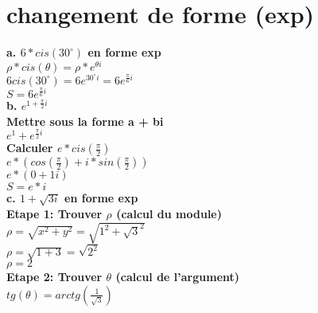 \newpage
\section{changement de forme (exp)}
\vspace{5mm}

\textbf{a. $6*cis(30^{\circ})$ en forme exp} \\

$\rho*cis(\theta) = \rho * e^{\theta i}$\\

$6 cis(30^{\circ}) = 6e^{30^{\circ}i} = 6e^{\frac{\pi}{6}i}$ \\

$S = 6e^{\frac{\pi}{6}i}$ \\

\vspace{6mm}
\textbf{b. $e^{1 + \frac{\pi}{2}i}$} \\

\textbf{Mettre sous la forme a + bi} \\

$e^{1} + e^{\frac{\pi}{2}i}$ \\

\textbf{Calculer $e*cis(\frac{\pi}{2})$} \\

$e * ( cos(\frac{\pi}{2}) + i*sin(\frac{\pi}{2}) ) $ \\

$e * ( 0 + 1i ) $ \\

$S = e * i $ \\

\vspace{6mm}
\textbf{c. $1 + \sqrt{3i}$ en forme exp} \\

\vspace{3mm}
\textbf{Etape 1: Trouver $\rho$ (calcul du module)} \\

$\rho = \sqrt{x^{2} + y^{2}} = \sqrt{1^{2} + \sqrt{3}^{2}}$ \\

$\rho = \sqrt{1 + 3} = \sqrt{2^{2}}$ \\

$\rho = 2$ \\

\vspace{3mm}
\textbf{Etape 2: Trouver $\theta$ (calcul de l'argument)} \\

$tg(\theta) = arctg(\frac{1}{\sqrt{3}})$ \\

